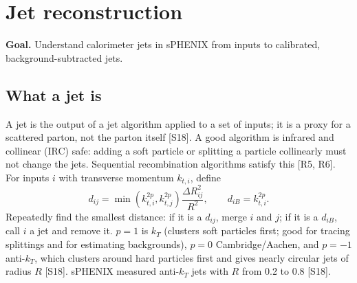 \documentclass[11pt,letterpaper]{article}
\newcommand{\goal}[1]{\par\noindent\textbf{Goal.} #1\par}
\begin{document}
\section{Jet reconstruction}\label{sec:jets}
\goal{Understand calorimeter jets in sPHENIX from inputs to calibrated, background-subtracted jets.}

\subsection{What a jet is}
A jet is the output of a jet algorithm applied to a set of inputs; it is a proxy for a scattered parton, not the parton itself [S18].
A good algorithm is infrared and collinear (IRC) safe: adding a soft particle or splitting a particle collinearly must not change the jets.
Sequential recombination algorithms satisfy this [R5, R6]. For inputs $i$ with transverse momentum $k_{t,i}$, define
\begin{equation}
d_{ij}=\min\!\left(k_{t,i}^{2p},k_{t,j}^{2p}\right)\frac{\Delta R_{ij}^2}{R^2},\qquad d_{iB}=k_{t,i}^{2p}.
\end{equation}
Repeatedly find the smallest distance: if it is a $d_{ij}$, merge $i$ and $j$; if it is a $d_{iB}$, call $i$ a jet and remove it.
$p=1$ is $k_T$ (clusters soft particles first; good for tracing splittings and for estimating backgrounds), $p=0$ Cambridge/Aachen, and $p=-1$ anti-$k_T$,
which clusters around hard particles first and gives nearly circular jets of radius $R$ [S18]. sPHENIX measured anti-$k_T$ jets with $R$ from 0.2 to 0.8 [S18].
\end{document}
